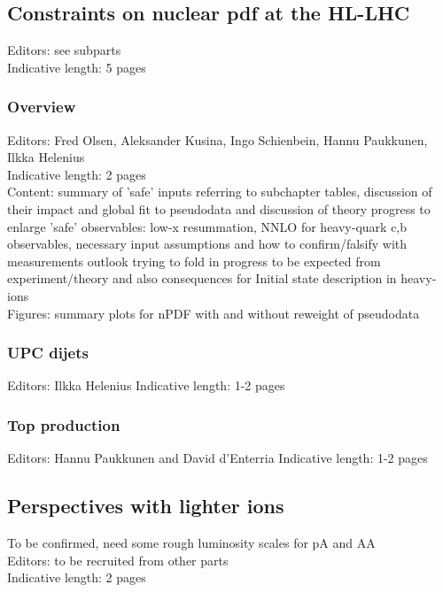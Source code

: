 \documentclass[../report.tex]{subfiles}
\begin{document}
\subsection{Constraints on nuclear pdf at the HL-LHC}
Editors: see subparts\\
Indicative length: 5 pages
\subsubsection{Overview}
Editors: Fred Olsen, Aleksander Kusina, Ingo Schienbein, Hannu Paukkunen,   Ilkka Helenius\\
Indicative length: 2 pages \\
Content: summary of 'safe' inputs referring to subchapter tables, discussion of their impact and global fit to pseudodata and discussion of theory progress to enlarge 'safe' observables: low-x resummation, NNLO for heavy-quark c,b observables, necessary input assumptions and how to confirm/falsify with measurements
outlook trying to fold in progress to be expected from experiment/theory and also consequences for Initial state description in heavy-ions \\
Figures: summary plots for nPDF with and without reweight of pseudodata
\subsubsection{UPC dijets}
Editors: Ilkka Helenius 
Indicative length: 1-2 pages
\subsubsection{Top production}
Editors: Hannu Paukkunen and David d'Enterria
Indicative length: 1-2 pages

\subsection{Perspectives with lighter ions}
To be confirmed, need some rough luminosity scales for pA and AA \\
Editors: to be recruited from other parts \\
Indicative length: 2 pages \\
\end{document}
